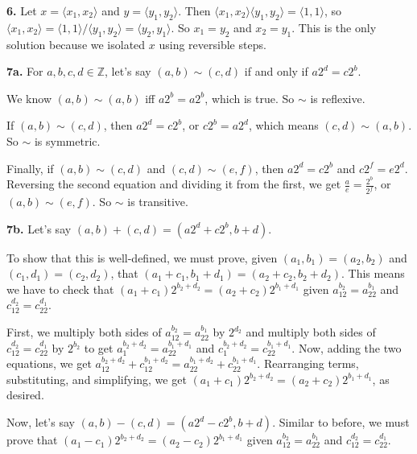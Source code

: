 \documentclass{article}
\begin{document}
\textbf{6.} Let $x = \langle x_1, x_2 \rangle$ and $y = \langle y_1, y_2 \rangle$. Then $\langle x_1, x_2 \rangle \langle y_1, y_2 \rangle = \langle 1, 1 \rangle$, so $\langle x_1, x_2 \rangle = \langle 1, 1 \rangle / \langle y_1, y_2 \rangle = \langle y_2, y_1 \rangle$. So $x_1 = y_2$ and $x_2 = y_1$. This is the only solution because we isolated $x$ using reversible steps.
\newline

\textbf{7a.} For $a, b, c, d \in \mathbb{Z}$, let's say $(a, b) \sim (c, d)$ if and only if $a2^d = c2^b$.
\newline

We know $(a, b) \sim (a, b)$ iff $a2^b = a2^b$, which is true. So $\sim$ is reflexive.
\newline

If $(a, b) \sim (c, d)$, then $a2^d = c2^b$, or $c2^b = a2^d$, which means $(c, d) \sim (a, b)$. So $\sim$ is symmetric.
\newline

Finally, if $(a, b) \sim (c, d)$ and $(c, d) \sim (e, f)$, then $a2^d = c2^b$ and $c2^f = e2^d$. Reversing the second equation and dividing it from the first, we get $\frac{a}{e} = \frac{2^b}{2^f}$, or $(a, b) \sim (e, f)$. So $\sim$ is transitive.
\newline

\textbf{7b.} Let's say $(a, b) + (c, d) = (a2^d + c2^b, b + d)$.
\newline

To show that this is well-defined, we must prove, given $(a_1, b_1) = (a_2, b_2)$ and $(c_1, d_1) = (c_2, d_2)$, that $(a_1 + c_1, b_1 + d_1) = (a_2 + c_2, b_2 + d_2)$. This means we have to check that $(a_1 + c_1)2^{b_2 + d_2} = (a_2 + c_2)2^{b_1 + d_1}$ given $a_12^{b_2} = a_22^{b_1}$ and $c_12^{d_2} = c_22^{d_1}$.
\newline

First, we multiply both sides of $a_12^{b_2} = a_22^{b_1}$ by $2^{d_2}$ and multiply both sides of $c_12^{d_2} = c_22^{d_1}$ by $2^{b_2}$ to get $a_1^{b_2 + d_2} = a_22^{b_1 + d_1}$ and $c_1^{b_2 + d_2} = c_22^{b_1 + d_1}$. Now, adding the two equations, we get $a_12^{b_2 + d_2} + c_12^{b_1 + d_2} = a_22^{b_1 + d_2} + c_22^{b_1 + d_1}$. Rearranging terms, substituting, and simplifying, we get $(a_1 + c_1)2^{b_2 + d_2} = (a_2 + c_2)2^{b_1 + d_1}$, as desired.
\newline

Now, let's say $(a, b) - (c, d) = (a2^d - c2^b, b + d)$. Similar to before, we must prove that $(a_1 - c_1)2^{b_2 + d_2} = (a_2 - c_2)2^{b_1 + d_1}$ given $a_12^{b_2} = a_22^{b_1}$ and $c_12^{d_2} = c_22^{d_1}$.
\newline
\end{document}
